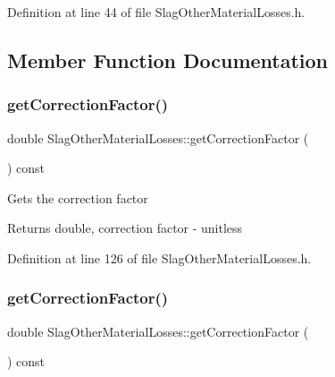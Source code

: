 Definition at line 44 of file Slag\+Other\+Material\+Losses.\+h.



\subsection{Member Function Documentation}
\mbox{\label{class_slag_other_material_losses_a920bbc2da2ba90416e86573830eee2cb}} 
\subsubsection{\texorpdfstring{get\+Correction\+Factor()}{getCorrectionFactor()}\hspace{0.1cm}{\footnotesize\ttfamily [1/3]}}
{\footnotesize\ttfamily double Slag\+Other\+Material\+Losses\+::get\+Correction\+Factor (\begin{DoxyParamCaption}{ }\end{DoxyParamCaption}) const\hspace{0.3cm}{\ttfamily [inline]}}

Gets the correction factor

\begin{DoxyReturn}{Returns}
double, correction factor -\/ unitless 
\end{DoxyReturn}


Definition at line 126 of file Slag\+Other\+Material\+Losses.\+h.

\mbox{\label{class_slag_other_material_losses_a920bbc2da2ba90416e86573830eee2cb}} 
\subsubsection{\texorpdfstring{get\+Correction\+Factor()}{getCorrectionFactor()}\hspace{0.1cm}{\footnotesize\ttfamily [2/3]}}
{\footnotesize\ttfamily double Slag\+Other\+Material\+Losses\+::get\+Correction\+Factor (\begin{DoxyParamCaption}{ }\end{DoxyParamCaption}) const\hspace{0.3cm}{\ttfamily [inline]}}

